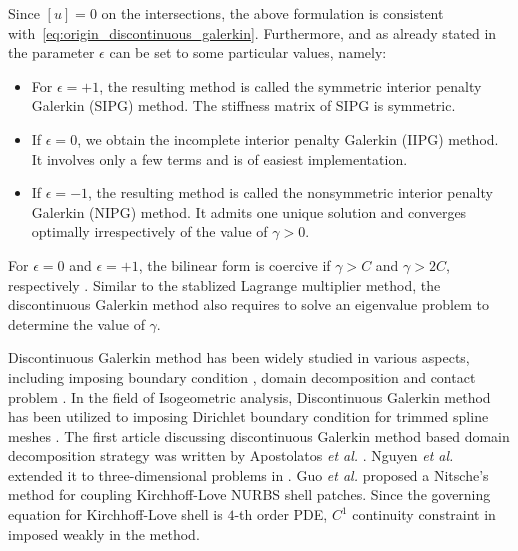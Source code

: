 \documentclass[preprint,12pt]{elsarticle}
\theoremstyle{remark}
\begin{document}
Since $\left[u\right]=0$ on the intersections, the above formulation is consistent with~\eqref{eq:origin_discontinuous_galerkin}. Furthermore, and as already stated in \cite{riviere2008discontinuous} the parameter $\epsilon$ can be set to some particular values, namely:
\begin{itemize}
    \item For $\epsilon=+1$, the resulting method is called the symmetric interior penalty Galerkin (SIPG) method. The stiffness matrix of SIPG is symmetric.
    \item If $\epsilon=0$, we obtain the incomplete interior penalty Galerkin (IIPG) method. It involves only a few terms and is of easiest implementation.
    \item If $\epsilon=-1$, the resulting method is called the nonsymmetric interior penalty Galerkin (NIPG) method. It admits one unique solution and converges optimally irrespectively of the value of $\gamma>0$.
\end{itemize}
For $\epsilon=0$ and $\epsilon=+1$, the bilinear form is coercive if $\gamma>C$ and $\gamma>2C$, respectively \cite{riviere2008discontinuous}. Similar to the stablized Lagrange multiplier method, the discontinuous Galerkin method also requires to solve an eigenvalue problem to determine the value of $\gamma$.\par

Discontinuous Galerkin method has been widely studied in various aspects, including imposing boundary condition \cite{hansbo_nitsches_2005}, domain decomposition \cite{becker_finite_2003} and contact problem \cite{chouly_symmetric_2015}. In the field of Isogeometric analysis, Discontinuous Galerkin method has been utilized to imposing Dirichlet boundary condition for trimmed spline meshes \cite{embar_imposing_2010}. The first article discussing discontinuous Galerkin method based domain decomposition strategy was written by Apostolatos \textit{et al.} \cite{apostolatos_nitsche-type_2014}. Nguyen \textit{et al.} extended it to three-dimensional problems in \cite{nguyen_nitsches_2014}. Guo \textit{et al.} \cite{guo_nitsches_2015} proposed a Nitsche's method for coupling Kirchhoff-Love NURBS shell patches. Since the governing equation for Kirchhoff-Love shell is $4$-th order PDE, $C^1$ continuity constraint in imposed weakly in the method. \par
\end{document}
